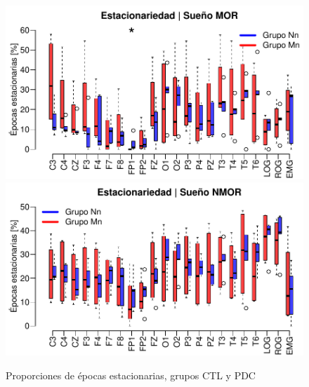 \begin{figure}
\centering
\includegraphics[width=\linewidth]
{./img_ejemplos/Comparacion_gpos_MOR_v2.pdf} \\
\includegraphics[width=\linewidth]
{./img_ejemplos/Comparacion_gpos_NMOR_v2.pdf}
\caption{Proporciones de épocas estacionarias, grupos CTL y PDC}
\label{comparacion_graf}
\end{figure}



